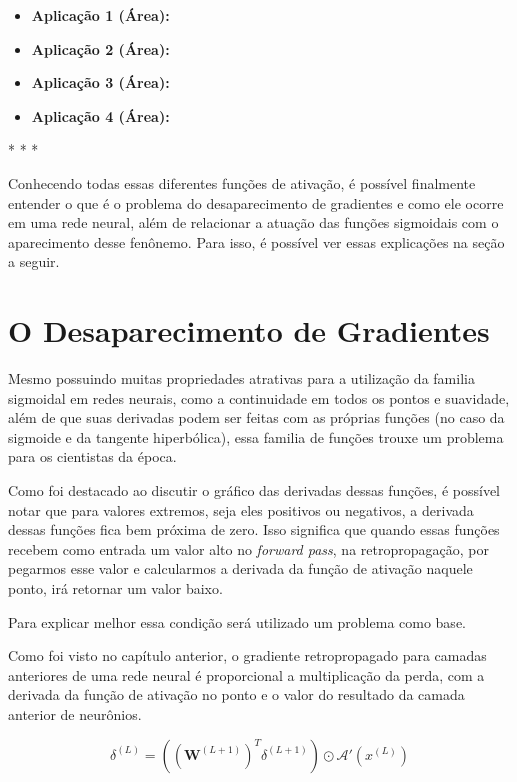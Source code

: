 \begin{itemize}
    \item \textbf{Aplicação 1 (Área):}
    \item \textbf{Aplicação 2 (Área):}
    \item \textbf{Aplicação 3 (Área):}
    \item \textbf{Aplicação 4 (Área):}
\end{itemize}

\medskip
\begin{center}
 * * *
\end{center}
\medskip

Conhecendo todas essas diferentes funções de ativação, é possível finalmente entender o que é o problema do desaparecimento de gradientes e como ele ocorre em uma rede neural, além de relacionar a atuação das funções sigmoidais com o aparecimento desse fenônemo. Para isso, é possível ver essas explicações na seção a seguir.

\section{O Desaparecimento de Gradientes}

Mesmo possuindo muitas propriedades atrativas para a utilização da familia sigmoidal em redes neurais, como a continuidade em todos os pontos e suavidade, além de que suas derivadas podem ser feitas com as próprias funções (no caso da sigmoide e da tangente hiperbólica), essa familia de funções trouxe um problema para os cientistas da época.

Como foi destacado ao discutir o gráfico das derivadas dessas funções, é possível notar que para valores extremos, seja eles positivos ou negativos, a derivada dessas funções fica bem próxima de zero. Isso significa que quando essas funções recebem como entrada um valor alto no \textit{forward pass}, na retropropagação, por pegarmos esse valor e calcularmos a derivada da função de ativação naquele ponto, irá retornar um valor baixo.

Para explicar melhor essa condição será utilizado um problema como base.

Como foi visto no capítulo anterior, o gradiente retropropagado para camadas anteriores de uma rede neural é proporcional a multiplicação da perda, com a derivada da função de ativação no ponto e o valor do resultado da camada anterior de neurônios. 

\[
    \delta^{(L)} = \left( \left( \textbf{W}^{(L+1)} \right)^T \delta^{(L+1)} \right)  \odot \mathcal{A}'(x^{(L)})
\]

